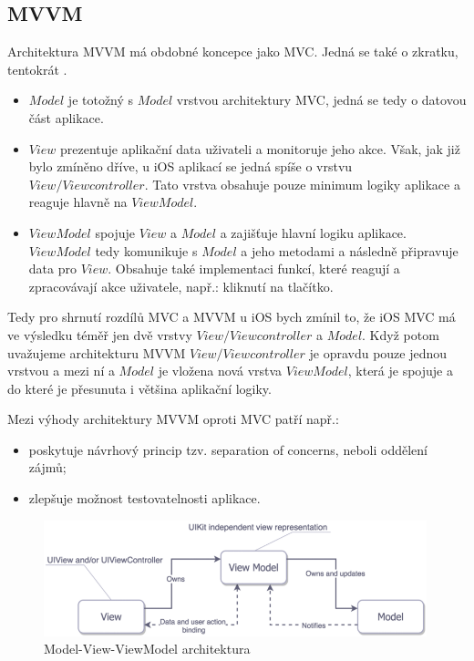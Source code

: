 \documentclass[thesis=M,czech]{FITthesis}[2012/06/26]
\begin{document}
\subsection{MVVM}
Architektura MVVM má obdobné koncepce jako MVC. Jedná se také o zkratku, tentokrát . \cite{MVVMMicrosoft}
\begin{itemize}
\item $Model$ je totožný s $Model$ vrstvou architektury MVC, jedná se tedy o datovou část aplikace.
\item $View$ prezentuje aplikační data uživateli a monitoruje jeho akce. Však, jak již bylo zmíněno dříve, u iOS aplikací se jedná spíše o vrstvu\\ $View/View controller$. Tato vrstva obsahuje pouze minimum logiky aplikace a reaguje hlavně na $ViewModel$.  \cite{Morrison}
\item $ViewModel$ spojuje $View$ a $Model$ a zajišťuje hlavní logiku aplikace. $ViewModel$ tedy komunikuje s  $Model$ a jeho metodami a následně připravuje data pro $View$. Obsahuje také implementaci funkcí, které reagují a zpracovávají akce uživatele, např.: kliknutí na tlačítko. \cite{MVVMMicrosoft}
\end{itemize}

Tedy pro shrnutí rozdílů MVC a MVVM u iOS bych zmínil to, že iOS MVC má ve výsledku téměř jen dvě vrstvy $View/View controller$ a $Model$. Když potom uvažujeme architekturu MVVM $View/View controller$  je opravdu pouze jednou vrstvou a mezi ní a $Model$ je vložena nová vrstva  $ViewModel$, která je spojuje a do které je přesunuta i většina aplikační logiky.

Mezi výhody architektury MVVM oproti MVC patří např.:
\begin{itemize}
\item poskytuje návrhový princip tzv. separation of concerns, neboli oddělení zájmů;
\item zlepšuje možnost testovatelnosti aplikace.
\end{itemize}

\begin{figure}[h]\centering
 \includegraphics[width=0.99\textwidth]{./pictures/architektury/MVVM}
 \caption[Model-View-ViewModel architektura]{Model-View-ViewModel architektura \cite{mvvm-pic}}\label{fig:mvvm}
\end{figure}
\end{document}
